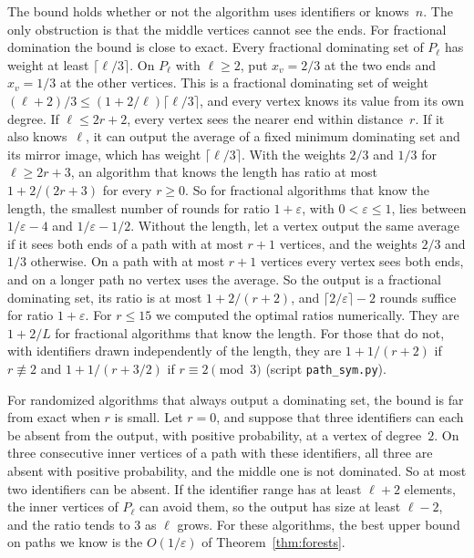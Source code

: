 \documentclass[11pt]{article}
\theoremstyle{remark}
\begin{document}
The bound holds whether or not the algorithm uses identifiers or knows~$n$. The only obstruction
is that the middle vertices cannot see the ends. For fractional domination the bound is close to
exact. Every fractional dominating set of $P_\ell$ has weight at least $\lceil\ell/3\rceil$. On
$P_\ell$ with $\ell\ge2$, put $x_v=2/3$ at the two ends and $x_v=1/3$ at the other vertices. This is a
fractional dominating set of weight $(\ell+2)/3\le(1+2/\ell)\lceil\ell/3\rceil$, and every vertex
knows its value from its own degree. If $\ell\le2r+2$, every vertex sees the nearer end within
distance~$r$. If it also knows~$\ell$, it can output the average of a fixed minimum dominating set
and its mirror image, which has weight $\lceil\ell/3\rceil$. With the weights $2/3$ and $1/3$ for
$\ell\ge2r+3$, an algorithm that knows the length has ratio at most $1+2/(2r+3)$ for every $r\ge0$.
So for fractional algorithms that know the length, the smallest number of rounds for ratio
$1+\varepsilon$, with $0<\varepsilon\le1$, lies between $1/\varepsilon-4$ and $1/\varepsilon-1/2$.
Without the length, let a vertex output the same average if it sees both ends of a path with at
most $r+1$ vertices, and the weights $2/3$ and $1/3$ otherwise. On a path with at most $r+1$
vertices every vertex sees both ends, and on a longer path no vertex uses the average. So the output
is a fractional dominating set, its ratio is at most $1+2/(r+2)$, and $\lceil2/\varepsilon\rceil-2$
rounds suffice for ratio $1+\varepsilon$. For $r\le15$ we computed the optimal ratios numerically.
They are $1+2/L$ for fractional algorithms that know the length. For those that do not, with
identifiers drawn independently of the length, they are $1+1/(r+2)$ if $r\not\equiv2$ and
$1+1/(r+3/2)$ if $r\equiv2\pmod 3$ (script \texttt{path\_sym.py}).

For randomized algorithms that always output a dominating set, the bound is far from exact when $r$
is small. Let $r=0$, and suppose that three identifiers can each be absent from the output, with
positive probability, at a vertex of degree~$2$. On three consecutive inner vertices of a path with
these identifiers, all three are absent with positive probability, and the middle one is not
dominated. So at most two identifiers can be absent. If the identifier range has at least $\ell+2$
elements, the inner vertices of $P_\ell$ can avoid them, so the output has size at least $\ell-2$,
and the ratio tends to $3$ as $\ell$ grows. For these algorithms, the best upper bound on paths we
know is the $O(1/\varepsilon)$ of Theorem~\ref{thm:forests}.
\end{document}
